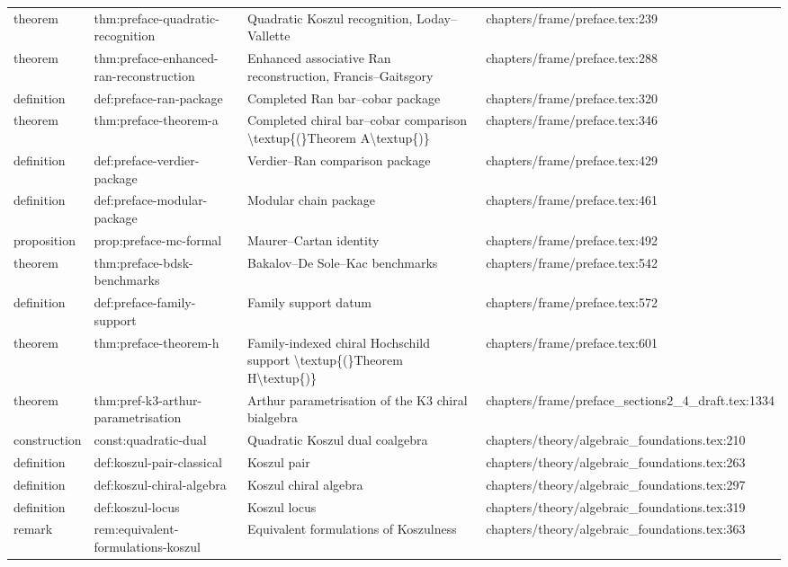 \documentclass[11pt]{article}
\begin{document}
\begin{longtable}{L{0.10\textwidth}L{0.26\textwidth}L{0.42\textwidth}L{0.22\textwidth}}
theorem & thm:preface-quadratic-recognition & Quadratic Koszul recognition, Loday--Vallette & chapters/frame/preface.tex:239\\
theorem & thm:preface-enhanced-ran-reconstruction & Enhanced associative Ran reconstruction, Francis--Gaitsgory & chapters/frame/preface.tex:288\\
definition & def:preface-ran-package & Completed Ran bar--cobar package & chapters/frame/preface.tex:320\\
theorem & thm:preface-theorem-a & Completed chiral bar--cobar comparison \textbackslash{}textup\{(\}Theorem A\textbackslash{}textup\{)\} & chapters/frame/preface.tex:346\\
definition & def:preface-verdier-package & Verdier--Ran comparison package & chapters/frame/preface.tex:429\\
definition & def:preface-modular-package & Modular chain package & chapters/frame/preface.tex:461\\
proposition & prop:preface-mc-formal & Maurer--Cartan identity & chapters/frame/preface.tex:492\\
theorem & thm:preface-bdsk-benchmarks & Bakalov--De Sole--Kac benchmarks & chapters/frame/preface.tex:542\\
definition & def:preface-family-support & Family support datum & chapters/frame/preface.tex:572\\
theorem & thm:preface-theorem-h & Family-indexed chiral Hochschild support \textbackslash{}textup\{(\}Theorem H\textbackslash{}textup\{)\} & chapters/frame/preface.tex:601\\
theorem & thm:pref-k3-arthur-parametrisation & Arthur parametrisation of the K3 chiral bialgebra & chapters/frame/preface\_sections2\_4\_draft.tex:1334\\
construction & const:quadratic-dual & Quadratic Koszul dual coalgebra & chapters/theory/algebraic\_foundations.tex:210\\
definition & def:koszul-pair-classical & Koszul pair & chapters/theory/algebraic\_foundations.tex:263\\
definition & def:koszul-chiral-algebra & Koszul chiral algebra & chapters/theory/algebraic\_foundations.tex:297\\
definition & def:koszul-locus & Koszul locus & chapters/theory/algebraic\_foundations.tex:319\\
remark & rem:equivalent-formulations-koszul & Equivalent formulations of Koszulness & chapters/theory/algebraic\_foundations.tex:363\\

\end{longtable}
\end{document}

